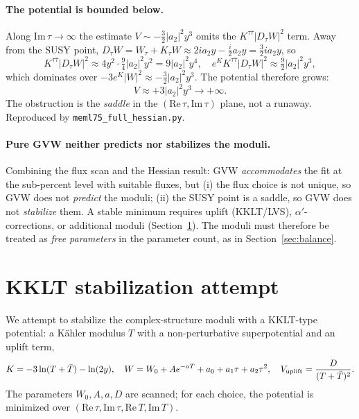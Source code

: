 \documentclass[12pt,a4paper]{article}
\numberwithin{equation}{section}
\begin{document}
\paragraph{The potential is bounded below.}
Along \(\mathrm{Im}\,\tau\to\infty\) the estimate
\(V\sim-\tfrac{3}{2}|a_2|^2y^3\) omits the
\(K^{\tau\bar\tau}|D_\tau W|^2\) term. Away from the SUSY point,
\(D_\tau W = W_\tau + K_\tau W \approx 2ia_2y - \tfrac{i}{2}a_2y
= \tfrac{3}{2}ia_2y\), so
\begin{equation}
K^{\tau\bar\tau}|D_\tau W|^2 \approx 4y^2 \cdot \tfrac{9}{4}|a_2|^2y^2
= 9|a_2|^2y^4, \quad
e^K K^{\tau\bar\tau}|D_\tau W|^2 \approx \tfrac{9}{2}|a_2|^2y^3,
\end{equation}
which dominates over \(-3e^K|W|^2 \approx -\tfrac{3}{2}|a_2|^2y^3\).
The potential therefore grows:
\begin{equation}
V \approx +3|a_2|^2 y^3 \to +\infty.
\end{equation}
The obstruction is the \emph{saddle} in the \((\mathrm{Re}\,\tau,\mathrm{Im}\,\tau)\)
plane, not a runaway. Reproduced by \texttt{meml75\_full\_hessian.py}.

\paragraph{Pure GVW neither predicts nor stabilizes the moduli.}
Combining the flux scan and the Hessian result: GVW
\emph{accommodates} the fit at the sub-percent level with suitable
fluxes, but (i) the flux choice is not unique, so GVW does not
\emph{predict} the moduli; (ii) the SUSY point is a saddle, so GVW
does not \emph{stabilize} them. A stable minimum requires uplift
(KKLT/LVS), \(\alpha'\)-corrections, or additional moduli
(Section~\ref{sec:kklt}). The moduli must therefore be treated as
\emph{free parameters} in the parameter count, as in
Section~\ref{sec:balance}.

\section{KKLT stabilization attempt}
\label{sec:kklt}

We attempt to stabilize the complex-structure moduli with a KKLT-type
potential: a K\"ahler modulus \(T\) with a non-perturbative
superpotential and an uplift term,
\begin{equation}
K = -3\ln(T+\bar T) - \ln(2y), \quad
W = W_0 + A e^{-aT} + a_0 + a_1\tau + a_2\tau^2, \quad
V_{\rm uplift} = \frac{D}{(T+\bar T)^2}.
\end{equation}
The parameters \(W_0, A, a, D\) are scanned; for each choice, the
potential is minimized over \((\mathrm{Re}\,\tau, \mathrm{Im}\,\tau,
\mathrm{Re}\,T, \mathrm{Im}\,T)\).
\end{document}
